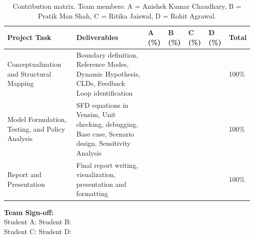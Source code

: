 \documentclass[12pt, a4paper]{article}
\begin{document}
\begin{table}[H]
    \centering
    \renewcommand{\arraystretch}{1.5}
    \begin{tabular}{|p{4cm}|p{3.5cm}|p{1.5cm}|p{1.5cm}|p{1.5cm}|p{1.5cm}|p{1cm}|}
        \hline
        \textbf{Project Task} & \textbf{Deliverables} & \textbf{A (\%)} & \textbf{B (\%)} & \textbf{C (\%)} & \textbf{D (\%)} & \textbf{Total} \\
        \hline
        Conceptualization and Structural Mapping & Boundary definition, Reference Modes, Dynamic Hypothesis, CLDs, Feedback Loop identification & & & & & 100\% \\
        \hline
        Model Formulation, Testing, and Policy Analysis & SFD equations in Vensim, Unit checking, debugging, Base case, Scenario design, Sensitivity Analysis & & & & & 100\% \\
        \hline
        Report and Presentation & Final report writing, visualization, presentation and formatting & & & & & 100\% \\
        \hline
    \end{tabular}
    \caption{Contribution matrix. Team members: A = Anishek Kumar Chaudhary, B = Pratik Man Shah, C = Ritika Jaiswal, D = Rohit Agrawal.}
\end{table}

\noindent \textbf{Team Sign-off:}\\[1em]
Student A: \underline{\hspace{5cm}} \hfill Student B: \underline{\hspace{5cm}}\\[1.5em]
Student C: \underline{\hspace{5cm}} \hfill Student D: \underline{\hspace{5cm}}
\end{document}

